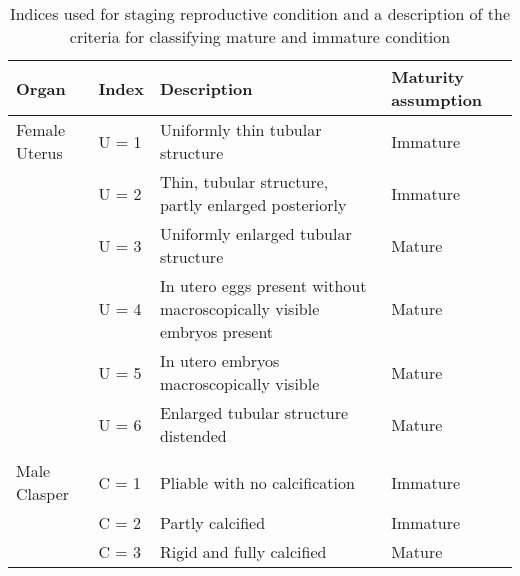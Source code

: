 \documentclass[]{article}
\title{}
\author{}
\date{}
\begin{document}
\begin{table}[ht]
\centering
\caption{Indices used for staging reproductive condition and a description of the criteria for classifying mature and immature condition \newline} 
\begin{tabular}{llll}
  \toprule
Organ & Index & Description & Maturity assumption \\ 
  \midrule
Female Uterus & U  = 1 & Uniformly thin tubular structure & Immature \\ 
   & U  = 2 & Thin, tubular structure, partly enlarged posteriorly & Immature \\ 
   & U  = 3 & Uniformly enlarged tubular structure & Mature \\ 
   & U  = 4 & In utero eggs present without macroscopically visible embryos present & Mature \\ 
   & U  = 5 & In utero embryos macroscopically visible & Mature \\ 
   & U  = 6 & Enlarged tubular structure distended & Mature \\ 
   &  &  &  \\ 
  Male Clasper & C = 1 & Pliable with no calcification & Immature \\ 
   & C = 2 & Partly calcified & Immature \\ 
   & C = 3 & Rigid and fully calcified & Mature \\ 
   \bottomrule
\end{tabular}
\end{table}
\end{document}
